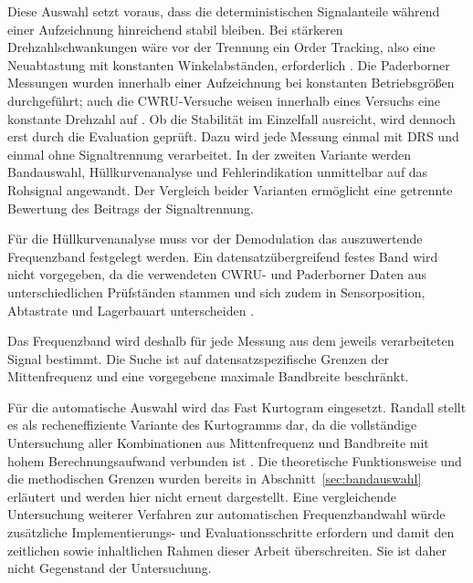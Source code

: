 Diese Auswahl setzt voraus, dass die deterministischen Signalanteile während
einer Aufzeichnung hinreichend stabil bleiben. Bei stärkeren
Drehzahlschwankungen wäre vor der Trennung ein Order Tracking, also eine
Neuabtastung mit konstanten Winkelabständen, erforderlich
\cite[S.~18]{randallComparisonMethodsSeparation2011}. Die Paderborner
Messungen wurden innerhalb einer Aufzeichnung bei konstanten Betriebsgrößen
durchgeführt; auch die CWRU-Versuche weisen innerhalb eines Versuchs eine
konstante Drehzahl auf
\cites[S.~8, Abschn.~4.2 und Tab.~6]
{lessmeierConditionMonitoringBearing2016}
[S.~102--103, Abschn.~3.1]
{smithRollingElementBearing2015}.
Ob die Stabilität im Einzelfall ausreicht, wird dennoch erst durch die
Evaluation geprüft. Dazu wird jede Messung einmal mit DRS und einmal ohne
Signaltrennung verarbeitet. In der zweiten Variante werden Bandauswahl,
Hüllkurvenanalyse und Fehlerindikation unmittelbar auf das Rohsignal
angewandt. Der Vergleich beider Varianten ermöglicht eine getrennte Bewertung
des Beitrags der Signaltrennung.

\label{par:auswahl_frequenzband}

Für die Hüllkurvenanalyse muss vor der Demodulation das auszuwertende
Frequenzband festgelegt werden. Ein datensatzübergreifend festes Band wird
nicht vorgegeben, da die verwendeten CWRU- und Paderborner Daten aus
unterschiedlichen Prüfständen stammen und sich zudem in Sensorposition,
Abtastrate und Lagerbauart unterscheiden
\cites[S.~102--103, Abschn.~3.1--3.2 und Tab.~2]
{smithRollingElementBearing2015}
[S.7, Abschn.~3 und 4--4.1]
{lessmeierConditionMonitoringBearing2016}.

Das Frequenzband wird deshalb für jede Messung aus dem jeweils verarbeiteten
Signal bestimmt. Die Suche ist auf datensatzspezifische Grenzen der
Mittenfrequenz und eine vorgegebene maximale Bandbreite beschränkt.

Für die automatische Auswahl wird das Fast Kurtogram eingesetzt. Randall
stellt es als recheneffiziente Variante des Kurtogramms dar, da die
vollständige Untersuchung aller Kombinationen aus Mittenfrequenz und
Bandbreite mit hohem Berechnungsaufwand verbunden ist
\cite[S.~193--195, Abschn.~5.5.3--5.5.3.1]
{randallVibrationbasedConditionMonitoring2022}.
Die theoretische Funktionsweise und die methodischen Grenzen wurden bereits
in Abschnitt~\ref{sec:bandauswahl} erläutert und werden hier nicht erneut
dargestellt. Eine vergleichende Untersuchung weiterer Verfahren zur
automatischen Frequenzbandwahl würde zusätzliche Implementierungs- und
Evaluationsschritte erfordern und damit den zeitlichen sowie inhaltlichen
Rahmen dieser Arbeit überschreiten. Sie ist daher nicht Gegenstand der
Untersuchung.

